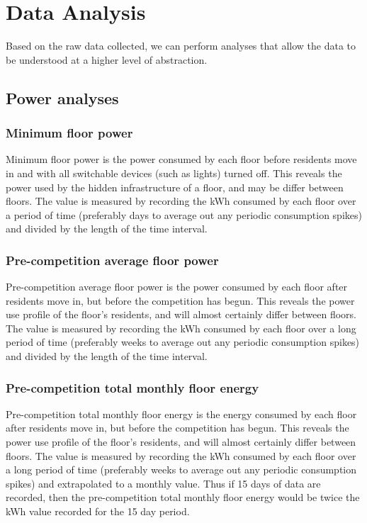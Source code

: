 \section{Data Analysis}

Based on the raw data collected, we can perform analyses that allow the data to be understood at a higher level of abstraction.

\subsection{Power analyses}

\subsubsection{Minimum floor power}
\label{sec:min-floor-power}
Minimum floor power is the power consumed by each floor before residents move in and with all switchable devices (such as lights) turned off. This reveals the power used by the hidden infrastructure of a floor, and may be differ between floors. The value is measured by recording the kWh consumed by each floor over a period of time (preferably days to average out any periodic consumption spikes) and divided by the length of the time interval.

\subsubsection{Pre-competition average floor power}
Pre-competition average floor power is the power consumed by each floor after residents move in, but before the competition has begun. This reveals the power use profile of the floor's residents, and will almost certainly differ between floors. The value is measured by recording the kWh consumed by each floor over a long period of time (preferably weeks to average out any periodic consumption spikes) and divided by the length of the time interval.

\subsubsection{Pre-competition total monthly floor energy}
Pre-competition total monthly floor energy is the energy consumed by each floor after residents move in, but before the competition has begun. This reveals the power use profile of the floor's residents, and will almost certainly differ between floors. The value is measured by recording the kWh consumed by each floor over a long period of time (preferably weeks to average out any periodic consumption spikes) and extrapolated to a monthly value. Thus if 15 days of data are recorded, then the pre-competition total monthly floor energy would be twice the kWh value recorded for the 15 day period.

